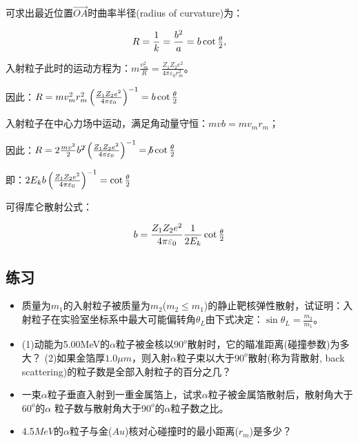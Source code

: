 

可求出最近位置$\overrightarrow {OA} $时曲率半径(radius of
curvature)为：

\begin{equation*}
R = \frac{1}{k} = \frac{{b^2 }}{a} = b\cot {\textstyle{\theta \over
2}},
\end{equation*}


入射粒子此时的运动方程为：$m\frac{{v_m^2 }}{R} = \frac{{Z_1 Z_2 e^2
}}{{4\pi \varepsilon _0 r_m^2 }}$。

因此：$R = mv_m^2 r_m^2 \left( {\frac{{Z_1 Z_2 e^2 }}{{4\pi \varepsilon _0 }}} \right)^{ - 1}  = b\cot {\textstyle{\theta  \over 2}}$

入射粒子在中心力场中运动，满足角动量守恒：$mvb = mv_m r_m $；

因此：$R = 2\frac{{mv^2 }}{2}b^{\not 2} \left( {\frac{{Z_1 Z_2 e^2 }}{{4\pi \varepsilon _0 }}} \right)^{ - 1}  = \not b\cot {\textstyle{\theta  \over 2}}$

即：$2E_k b\left( {\frac{{Z_1 Z_2 e^2 }}{{4\pi \varepsilon _0 }}} \right)^{ - 1}  = \cot {\textstyle{\theta  \over 2}}$

可得库仑散射公式：

\begin{equation*}
b = \frac{{Z_1 Z_2 e^2 }}{{4\pi \varepsilon _0 }}\frac{1}{{2E_k
}}\cot {\textstyle{\theta  \over 2}}
\end{equation*}

\subsection*{练习}

\begin{itemize}
\item{质量为$m_1$的入射粒子被质量为$m_2$($m_2 \le m_1$)}的静止靶核弹性散射，试证明：入射粒子在实验室坐标系中最大可能偏转角$\theta_L $由下式决定：$\sin \theta _L  = \frac{{m_2 }}{{m_1 }}$。

\item{(1)动能为5.00MeV的$\alpha$粒子被金核以$90^o$散射时，它的瞄准距离(碰撞参数)为多大？
(2)如果金箔厚$1.0\mu
m$，则入射$\alpha$粒子束以大于$90^o$散射(称为背散射, back
scattering)的粒子数是全部入射粒子的百分之几？}

\item{一束$\alpha$粒子垂直入射到一重金属箔上，试求$\alpha$粒子被金属箔散射后，散射角大于$60^o$的$\alpha$
粒子数与散射角大于$90^o$的$\alpha$粒子数之比。}

\item{4.5$MeV$的$\alpha$粒子与金($Au$)核对心碰撞时的最小距离($r_m$)是多少？}

\end{itemize}


